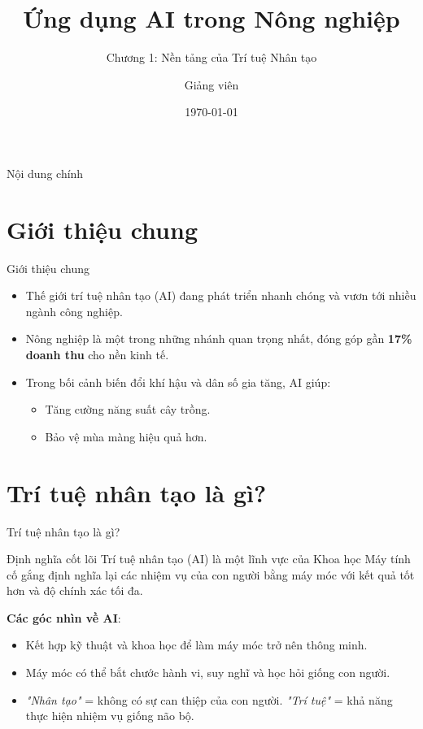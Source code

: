 \documentclass[aspectratio=169]{beamer}
\title[AI trong NN]{Ứng dụng AI trong Nông nghiệp}
\subtitle{Chương 1: Nền tảng của Trí tuệ Nhân tạo}
\author{Giảng viên}
\institute{Đại học Đông Á}
\date{\today}
\begin{document}
\begin{frame}
    \titlepage
\end{frame}

\begin{frame}{Nội dung chính}
    \tableofcontents
\end{frame}

\section{Giới thiệu chung}
\begin{frame}{Giới thiệu chung}
    \begin{itemize}
        \item Thế giới trí tuệ nhân tạo (AI) đang phát triển nhanh chóng và vươn tới nhiều ngành công nghiệp.
        \item Nông nghiệp là một trong những nhánh quan trọng nhất, đóng góp gần \textbf{17\% doanh thu} cho nền kinh tế.
        \item Trong bối cảnh biến đổi khí hậu và dân số gia tăng, AI giúp:
        \begin{itemize}
            \item Tăng cường năng suất cây trồng.
            \item Bảo vệ mùa màng hiệu quả hơn.
        \end{itemize}
    \end{itemize}
\end{frame}

\section{Trí tuệ nhân tạo là gì?}
\begin{frame}{Trí tuệ nhân tạo là gì?}
    \begin{block}{Định nghĩa cốt lõi}
        Trí tuệ nhân tạo (AI) là một lĩnh vực của Khoa học Máy tính cố gắng định nghĩa lại các nhiệm vụ của con người bằng máy móc với kết quả tốt hơn và độ chính xác tối đa.
    \end{block}
    
    \vspace{0.3cm}
    \textbf{Các góc nhìn về AI}:
    \begin{itemize}
        \item Kết hợp kỹ thuật và khoa học để làm máy móc trở nên thông minh.
        \item Máy móc có thể bắt chước hành vi, suy nghĩ và học hỏi giống con người.
        \item \textit{"Nhân tạo"} = không có sự can thiệp của con người. \textit{"Trí tuệ"} = khả năng thực hiện nhiệm vụ giống não bộ.
    \end{itemize}
\end{frame}
\end{document}
